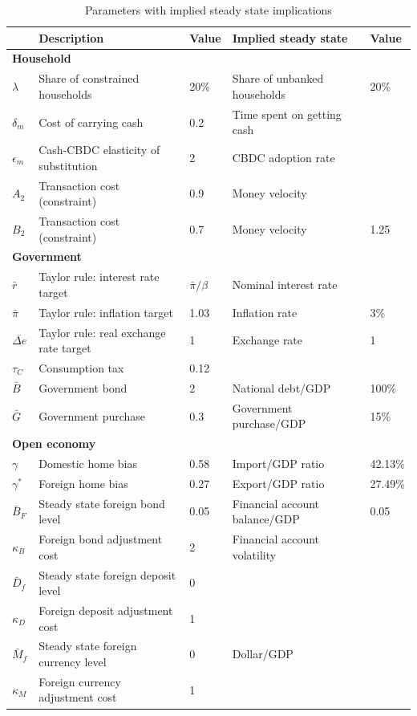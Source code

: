 \documentclass[12pt]{article}
\begin{document}
\begin{table}[h!]
\centering
\begin{tabular}{lllll}
\hline\hline
& Description & Value & Implied steady state & Value \\\hline
\multicolumn{5}{l}{\bf Household}     \\
$\lambda$  & Share of constrained households  & 20\%  & Share of unbanked households & 20\%  \\
$\delta_m$ & Cost of carrying cash & 0.2 & Time spent on getting cash \\
$\epsilon_m$ & Cash-CBDC elasticity of substitution &  2 & CBDC adoption rate \\
$A_2$      & Transaction cost (constraint)   & 0.9     & Money velocity    \\
$B_2$     & Transaction cost (constraint)   & 0.7      & Money velocity   & 1.25    \\
\multicolumn{5}{l}{\bf Government}     \\
$\bar{r}$     & Taylor rule: interest rate target            & $\bar{\pi}/\beta$    & Nominal interest rate &      	 \\
$\bar{\pi}$     & Taylor rule: inflation target       & 1.03        & Inflation rate & 3\%                        				 \\
$\overline{\Delta e}$    & Taylor rule: real exchange rate target       & 1   & Exchange rate & 1    			  \\
$\tau_C$ & Consumption tax & 0.12 &  \\
$\bar{B}$ & Government bond & 2 & National debt/GDP & 100\% \\
$\bar{G}$ & Government purchase & 0.3 & Government purchase/GDP & 15\% \\
\multicolumn{5}{l}{\bf Open economy} \\
$\gamma$     & Domestic home bias           & 0.58      & Import/GDP ratio             & 	42.13\%                           \\
$\gamma^*$  & Foreign home bias              & 0.27      & Export/GDP ratio             & 27.49\%                                     \\                                                   
$\bar{B}_F$       & Steady state foreign bond level    & 0.05     & Financial account balance/GDP &      0.05              \\
$\kappa_B$     & Foreign bond adjustment cost    & 2       & Financial account volatility &                                       \\
$\bar{D}_f$       & Steady state foreign deposit level   & 0  \\
$\kappa_D$      & Foreign deposit adjustment cost     & 1                                         \\
$\bar{M}_f$      & Steady state foreign currency level     & 0  &  Dollar/GDP     \\
$\kappa_M$     & Foreign currency adjustment cost     & 1                                         \\      \hline                                    
\end{tabular}
\caption{Parameters with implied steady state implications}
\end{table}
\end{document}
